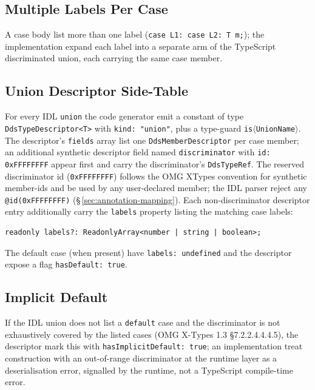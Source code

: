 \documentclass{../styles/zerodds-vendor-spec}
\begin{document}
\subsection{Multiple Labels Per Case}

A case body  list more than one label
(\texttt{case L1: case L2:\,T m;}); the implementation
 expand each label into a separate arm of the
TypeScript discriminated union, each carrying the same case
member.

\subsection{Union Descriptor Side-Table}\label{sec:union-descriptor}

For every IDL \texttt{union} the code generator 
emit a constant of type \texttt{DdsTypeDescriptor<T>} with
\texttt{kind:\,"union"}, plus a type-guard
\texttt{is$\langle$UnionName$\rangle$}. The descriptor's
\texttt{fields} array  list one
\texttt{DdsMemberDescriptor} per case member; an additional
synthetic descriptor field named \texttt{discriminator} with
\texttt{id:\,0xFFFFFFFF}  appear first and carry
the discriminator's \texttt{DdsTypeRef}. The reserved
discriminator id (\texttt{0xFFFFFFFF}) follows the OMG XTypes
convention for synthetic member-ids and  be
used by any user-declared member; the IDL parser 
reject any \texttt{@id(0xFFFFFFFF)} (\S\,\ref{sec:annotation-mapping}). Each non-discriminator
descriptor entry  additionally carry the
\texttt{labels} property listing the matching case labels:

\begin{lstlisting}
readonly labels?: ReadonlyArray<number | string | boolean>;
\end{lstlisting}

The default case (when present)  have
\texttt{labels:\,undefined} and the descriptor 
expose a flag \texttt{hasDefault:\,true}.

\subsection{Implicit Default}

If the IDL union does not list a \texttt{default} case and the
discriminator is not exhaustively covered by the listed cases
(OMG X-Types 1.3 §7.2.2.4.4.4.5), the descriptor 
mark this with \texttt{hasImplicitDefault:\,true}; an
implementation  treat construction with an
out-of-range discriminator at the runtime layer as a
deserialisation error, signalled by the runtime, not a TypeScript
compile-time error.
\end{document}
